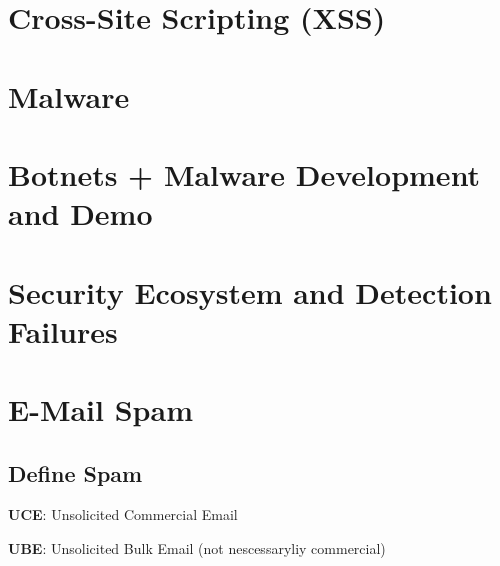 \documentclass[fs, footer]{latex4ei}
\begin{document}
\begin{multicols*}{4}
\section{Cross-Site Scripting (XSS)}


\section{Malware}

\section{Botnets + Malware Development and Demo}

\section{Security Ecosystem and Detection Failures}

\section{E-Mail Spam}
\subsection{Define Spam}
\textbf{UCE}: Unsolicited Commercial Email

\textbf{UBE}: Unsolicited Bulk Email (not nescessaryliy commercial)
\end{multicols*}

\end{document}
